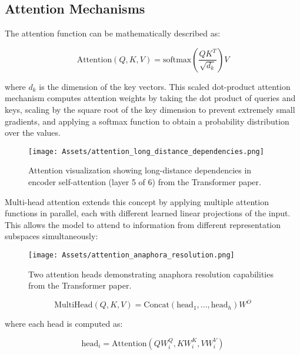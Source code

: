 \subsection{Attention Mechanisms}

The attention function can be mathematically described as:

\begin{equation}
\text{Attention}(Q, K, V) = \text{softmax}\left(\frac{QK^T}{\sqrt{d_k}}\right)V
\end{equation}

where $d_k$ is the dimension of the key vectors. This scaled dot-product attention mechanism computes attention weights by taking the dot product of queries and keys, scaling by the square root of the key dimension to prevent extremely small gradients, and applying a softmax function to obtain a probability distribution over the values.

\begin{figure}[H]
    \centering
    \texttt{[image: Assets/attention\_long\_distance\_dependencies.png]}
    \caption{Attention visualization showing long-distance dependencies in encoder self-attention (layer 5 of 6) from the Transformer paper.}
    \label{fig:attention_long_distance}
\end{figure}

Multi-head attention extends this concept by applying multiple attention functions in parallel, each with different learned linear projections of the input. This allows the model to attend to information from different representation subspaces simultaneously:

\begin{figure}[H]
    \centering
    \texttt{[image: Assets/attention\_anaphora\_resolution.png]}
    \caption{Two attention heads demonstrating anaphora resolution capabilities from the Transformer paper.}
    \label{fig:attention_anaphora}
\end{figure}

\begin{equation}
\text{MultiHead}(Q, K, V) = \text{Concat}(\text{head}_1, ..., \text{head}_h)W^O
\end{equation}

where each head is computed as:

\begin{equation}
\text{head}_i = \text{Attention}(QW_i^Q, KW_i^K, VW_i^V)
\end{equation}

